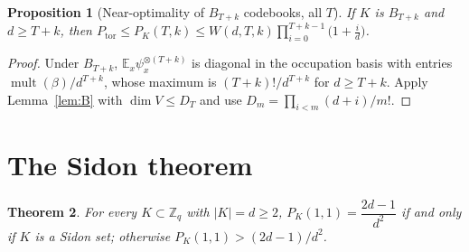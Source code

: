 \documentclass[11pt]{article}
\newcommand{\Z}{\mathbb{Z}}
\newcommand{\E}{\mathbb{E}}
\newcommand{\mult}{\operatorname{mult}}
\newcommand{\Ptor}{P_{\mathrm{tor}}}
\newtheorem{theorem}{Theorem}
\newtheorem{proposition}[theorem]{Proposition}
\theoremstyle{definition}
\theoremstyle{remark}
\begin{document}
\begin{proposition}[Near-optimality of $B_{T+k}$ codebooks, all $T$]\label{prop:nearW}
If $K$ is $B_{T+k}$ and $d\ge T+k$, then
$\Ptor\le P_K(T,k)\le W(d,T,k)\prod_{i=0}^{T+k-1}\big(1+\tfrac id\big)$.
\end{proposition}
\begin{proof}
Under $B_{T+k}$, $\E_x\psi_x^{\otimes(T+k)}$ is diagonal in the occupation basis with entries $\mult(\beta)/d^{T+k}$, whose
maximum is $(T+k)!/d^{T+k}$ for $d\ge T+k$. Apply Lemma~\ref{lem:B} with $\dim V\le D_T$ and use $D_m=\prod_{i<m}(d+i)/m!$.
\end{proof}

\section{The Sidon theorem}\label{sec:sidon}
\begin{theorem}\label{thm:sidon}
For every $K\subset\Z_q$ with $|K|=d\ge2$, $P_K(1,1)=\dfrac{2d-1}{d^2}$ if and only if $K$ is a Sidon set; otherwise
$P_K(1,1)>(2d-1)/d^2$.
\end{theorem}
\end{document}
